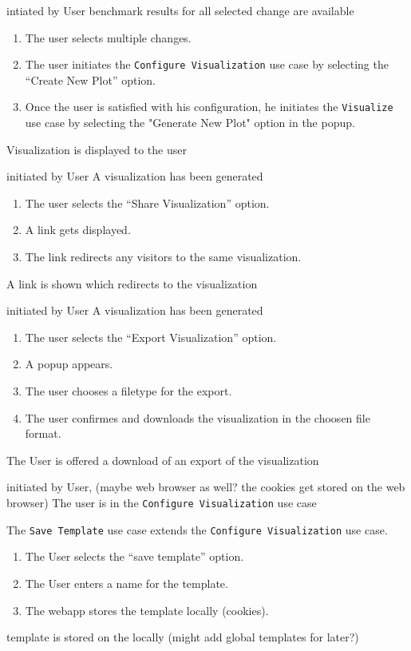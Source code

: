 \bigskip

{intiated by User}
{benchmark results for all selected change are available}
{\begin{enumerate}
    \item The user selects multiple changes.
    \item The user initiates the \texttt{Configure Visualization} use case by selecting the \enquote{Create New Plot} option.
    \item Once the user is satisfied with his \gls{configuration}, he initiates the \texttt{Visualize} use case by selecting the "Generate New Plot" option in the popup.
\end{enumerate}}
{Visualization is displayed to the user}

\bigskip

{initiated by User}
{A \gls{visualization} has been generated}
{\begin{enumerate}
    \item The user selects the \enquote{Share Visualization} option.
    \item A link gets displayed.
    \item The link redirects any visitors to the same \gls{visualization}.
\end{enumerate}} 
{A link is shown which redirects to the \gls{visualization}}

\bigskip

{initiated by User}
{A \gls{visualization} has been generated}
{\begin{enumerate}
    \item The user selects the \enquote{Export Visualization} option.
    \item A popup appears.
    \item The user chooses a filetype for the export.
    \item The user confirmes and downloads the \gls{visualization} in the choosen file format.
\end{enumerate}} 
{The User is offered a download of an export of the \gls{visualization}}

\bigskip

{initiated by User, (maybe web browser as well? the cookies get stored on the web browser)}
{The user is in the \texttt{Configure Visualization} use case}
{The \texttt{Save Template} use case extends the \texttt{Configure Visualization} use case.
\begin{enumerate}
    \item The User selects the \enquote{save template} option.
    \item The User enters a name for the \gls{template}.
    \item The webapp stores the template locally (cookies).
\end{enumerate}} 
{\Gls{template} is stored on the locally (might add global templates for later?)}

